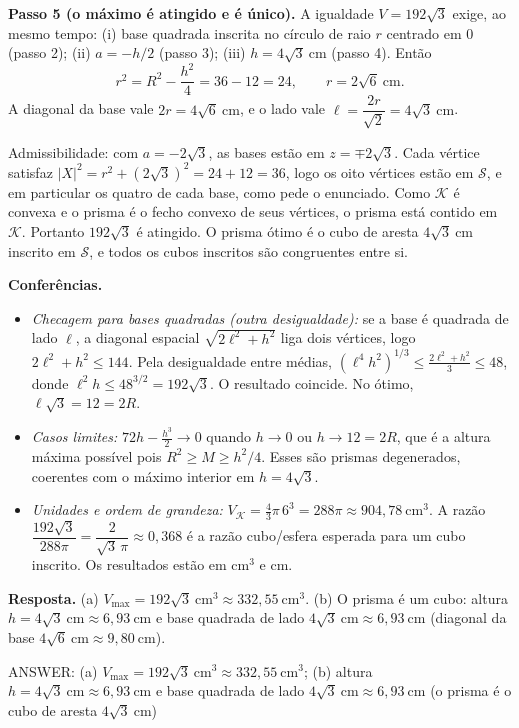 \documentclass{article}%
\begin{document}
\textbf{Passo 5 (o máximo é atingido e é único).} A igualdade $V=192\sqrt3$ exige, ao mesmo tempo: (i) base quadrada inscrita no círculo de raio $r$ centrado em $0$ (passo 2); (ii) $a=-h/2$ (passo 3); (iii) $h=4\sqrt3\ \text{cm}$ (passo 4). Então
\[
r^2=R^2-\frac{h^2}{4}=36-12=24,\qquad r=2\sqrt6\ \text{cm}.
\]
A diagonal da base vale $2r=4\sqrt6\ \text{cm}$, e o lado vale $\ell=\dfrac{2r}{\sqrt2}=4\sqrt3\ \text{cm}$.

Admissibilidade: com $a=-2\sqrt3$, as bases estão em $z=\mp 2\sqrt3$. Cada vértice satisfaz $|X|^2=r^2+(2\sqrt3)^2=24+12=36$, logo os oito vértices estão em $\mathcal{S}$, e em particular os quatro de cada base, como pede o enunciado. Como $\mathcal{K}$ é convexa e o prisma é o fecho convexo de seus vértices, o prisma está contido em $\mathcal{K}$. Portanto $192\sqrt3$ é atingido. O prisma ótimo é o cubo de aresta $4\sqrt3\ \text{cm}$ inscrito em $\mathcal{S}$, e todos os cubos inscritos são congruentes entre si.

\textbf{Conferências.}
\begin{itemize}
\item \textit{Checagem para bases quadradas (outra desigualdade):} se a base é quadrada de lado $\ell$, a diagonal espacial $\sqrt{2\ell^2+h^2}$ liga dois vértices, logo $2\ell^2+h^2\le 144$. Pela desigualdade entre médias, $(\ell^4h^2)^{1/3}\le\frac{2\ell^2+h^2}{3}\le 48$, donde $\ell^2h\le 48^{3/2}=192\sqrt3$. O resultado coincide. No ótimo, $\ell\sqrt3=12=2R$.
\item \textit{Casos limites:} $72h-\tfrac{h^3}{2}\to 0$ quando $h\to 0$ ou $h\to 12=2R$, que é a altura máxima possível pois $R^2\ge M\ge h^2/4$. Esses são prismas degenerados, coerentes com o máximo interior em $h=4\sqrt3$.
\item \textit{Unidades e ordem de grandeza:} $V_{\mathcal{K}}=\tfrac43\pi\,6^3=288\pi\approx 904{,}78\ \text{cm}^3$. A razão $\dfrac{192\sqrt3}{288\pi}=\dfrac{2}{\sqrt3\,\pi}\approx 0{,}368$ é a razão cubo/esfera esperada para um cubo inscrito. Os resultados estão em $\text{cm}^3$ e $\text{cm}$.
\end{itemize}

\textbf{Resposta.} (a) $V_{\max}=192\sqrt3\ \text{cm}^3\approx 332{,}55\ \text{cm}^3$. (b) O prisma é um cubo: altura $h=4\sqrt3\ \text{cm}\approx 6{,}93\ \text{cm}$ e base quadrada de lado $4\sqrt3\ \text{cm}\approx 6{,}93\ \text{cm}$ (diagonal da base $4\sqrt6\ \text{cm}\approx 9{,}80\ \text{cm}$).

ANSWER: (a) $V_{\max}=192\sqrt{3}\ \text{cm}^3\approx 332{,}55\ \text{cm}^3$; (b) altura $h=4\sqrt{3}\ \text{cm}\approx 6{,}93\ \text{cm}$ e base quadrada de lado $4\sqrt{3}\ \text{cm}\approx 6{,}93\ \text{cm}$ (o prisma é o cubo de aresta $4\sqrt{3}\ \text{cm}$)%
\newpage%
\end{document}
